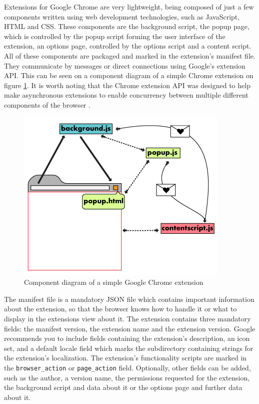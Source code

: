 \documentclass[12pt,a4paper,twoside]{report}
\begin{document}
Extensions for Google Chrome are very lightweight, being composed of just a few components written using web development technologies, such as JavaScript, HTML and CSS. These components are the background script, the popup page, which is controlled by the popup script forming the user interface of the extension, an options page, controlled by the options script and a content script. All of these components are packaged and marked in the extension's manifest file. They communicate by messages or direct connections using Google's extension API. This can be seen on a component diagram of a simple Chrome extension on figure \ref{fig:chrome_extension_component_communication}. It is worth noting that the Chrome extension API was designed to help make asynchronous extensions to enable concurrency between multiple different components of the browser \cite{chrome_extension_docs}.

\begin{figure}[ht]
  \centering
  \includegraphics[width=0.5\linewidth]{img/messagingarc.png}
  \caption[]{Component diagram of a simple Google Chrome extension \footnotemark[6]}
  \label{fig:chrome_extension_component_communication}
\end{figure}


The manifest file is a mandatory JSON file which contains important information about the extension, so that the browser knows how to handle it or what to display in the extensions view about it. The extension contains three mandatory fields: the manifest version, the extension name and the extension version. Google recommends you to include fields containing the extension's description, an icon set, and a default locale field which marks the subdirectory containing strings for the extension's localization. The extension's functionality scripts are marked in the \lstinline$browser_action$ or \lstinline$page_action$ field. Optionally, other fields can be added, such as the author, a version name, the permissions requested for the extension, the background script and data about it or the options page and further data about it.
\end{document}
